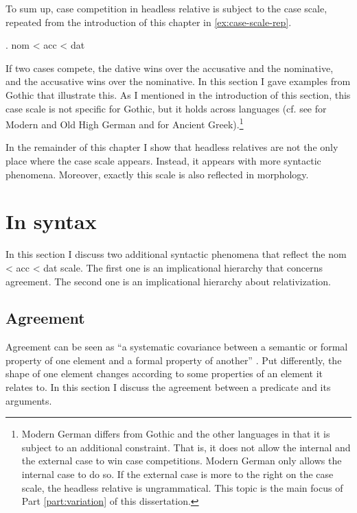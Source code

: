 To sum up, case competition in headless relative is subject to the case scale, repeated from the introduction of this chapter in \ref{ex:case-scale-rep}.

\ex. \ac{nom} < \ac{acc} < \ac{dat}\label{ex:case-scale-rep}

If two cases compete, the dative wins over the accusative and the nominative, and the accusative wins over the nominative. In this section I gave examples from Gothic that illustrate this. As I mentioned in the introduction of this section, this case scale is not specific for Gothic, but it holds across languages (cf. see \citealt{pittner1995} for Modern and Old High German and \citealt{grosu2003,kakarikos2014} for Ancient Greek).\footnote{
Modern German differs from Gothic and the other languages in that it is subject to an additional constraint. That is, it does not allow the internal and the external case to win case competitions. Modern German only allows the internal case to do so. If the external case is more to the right on the case scale, the headless relative is ungrammatical.
This topic is the main focus of Part \ref{part:variation} of this dissertation.}

In the remainder of this chapter I show that headless relatives are not the only place where the case scale appears. Instead, it appears with more syntactic phenomena. Moreover, exactly this scale is also reflected in morphology.


\section{In syntax}\label{sec:impl-hier}

In this section I discuss two additional syntactic phenomena that reflect the \ac{nom} < \ac{acc} < \ac{dat} scale. The first one is an implicational hierarchy that concerns agreement. The second one is an implicational hierarchy about relativization.


\subsection{Agreement}

Agreement can be seen as ``a systematic covariance between a semantic or formal property of one element and a formal property of another'' \citep{steel1978}. Put differently, the shape of one element changes according to some properties of an element it relates to. In this section I discuss the agreement between a predicate and its arguments.

